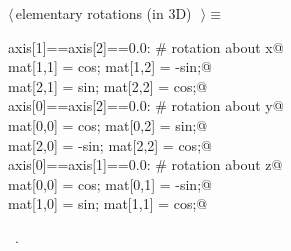 \documentclass[11pt,oneside]{article}	%
\begin{document}
\begin{flushleft} \small \label{scrap29}
$\langle\,$elementary rotations (in 3D)\nobreak\ {\footnotesize {}}$\,\rangle\equiv$
\vspace{-1ex}
\begin{list}{}{} \item
\mbox{}\verb@if axis[1]==axis[2]==0.0:  # rotation about x@\\
\mbox{}\verb@   mat[1,1] = cos;   mat[1,2] = -sin;@\\
\mbox{}\verb@   mat[2,1] = sin;   mat[2,2] = cos;@\\
\mbox{}\verb@elif axis[0]==axis[2]==0.0:   # rotation about y@\\
\mbox{}\verb@   mat[0,0] = cos;   mat[0,2] = sin;@\\
\mbox{}\verb@   mat[2,0] = -sin;  mat[2,2] = cos;@\\
\mbox{}\verb@elif axis[0]==axis[1]==0.0:   # rotation about z@\\
\mbox{}\verb@   mat[0,0] = cos;   mat[0,1] = -sin;@\\
\mbox{}\verb@   mat[1,0] = sin;   mat[1,1] = cos;@\\
\mbox{}\verb@@{\NWsep}
\end{list}
\vspace{-1ex}
\footnotesize\addtolength{\baselineskip}{-1ex}
\begin{list}{}{\setlength{\itemsep}{-\parsep}\setlength{\itemindent}{-\leftmargin}}
\item \NWtxtMacroRefIn\ .
\end{list}
\end{flushleft}
\end{document}
